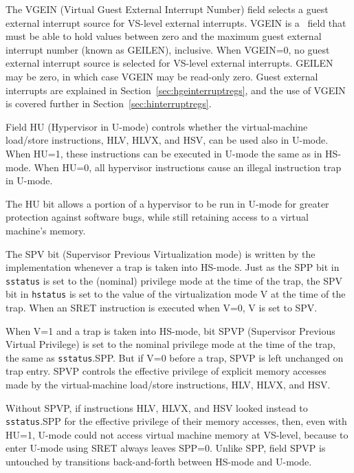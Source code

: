 The VGEIN (Virtual Guest External Interrupt Number) field selects a guest
external interrupt source for VS-level external interrupts.
VGEIN is a \wlrl\ field that must be able to hold values between zero
and the maximum guest external interrupt number (known as GEILEN),
inclusive.
When VGEIN=0, no guest external interrupt source is selected for VS-level
external interrupts.
GEILEN may be zero, in which case VGEIN may be read-only zero.
Guest external interrupts are explained in
Section~\ref{sec:hgeinterruptregs}, and the use of VGEIN is covered
further in Section~\ref{sec:hinterruptregs}.

Field HU (Hypervisor in U-mode) controls whether the virtual-machine
load/store instructions, HLV, HLVX, and HSV, can be used also in U-mode.
When HU=1, these instructions can be executed in U-mode the same as in
HS-mode.
When HU=0, all hypervisor instructions cause an illegal instruction trap
in U-mode.

\begin{commentary}
The HU bit allows a portion of a hypervisor to be run in U-mode for
greater protection against software bugs, while still retaining access to
a virtual machine's memory.
\end{commentary}

The SPV bit (Supervisor Previous Virtualization mode) is written by the implementation
whenever a trap is taken into HS-mode.
Just as the SPP bit in {\tt sstatus} is set to the (nominal) privilege
mode at the time of the trap, the SPV bit in {\tt hstatus} is set to the value of the virtualization
mode V at the time of the trap.  When an SRET instruction is executed when V=0,
V is set to SPV.

When V=1 and a trap is taken into HS-mode, bit SPVP (Supervisor Previous
Virtual Privilege) is set to the nominal privilege mode at the time of the trap,
the same as {\tt sstatus}.SPP.
But if V=0 before a trap, SPVP is left unchanged on trap entry.
SPVP controls the effective privilege of explicit memory accesses made by
the virtual-machine load/store instructions, HLV, HLVX, and HSV.

\begin{commentary}
Without SPVP, if instructions HLV, HLVX, and HSV looked instead to
{\tt sstatus}.SPP for the effective privilege of their memory accesses,
then, even with HU=1, U-mode could not access virtual machine memory at
VS-level, because to enter U-mode using SRET always leaves SPP=0.
Unlike SPP, field SPVP is untouched by transitions back-and-forth between
HS-mode and U-mode.
\end{commentary}

